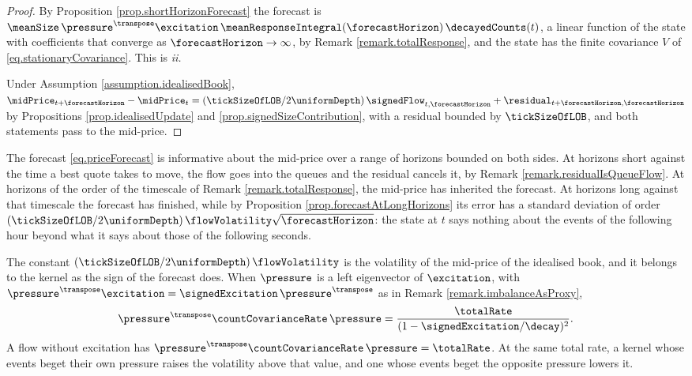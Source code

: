 \begin{proof}
 By Proposition \ref{prop.shortHorizonForecast} the forecast is
 $\meanSize \, \pressure^{\transpose} \excitation \,
 \meanResponseIntegral(\forecastHorizon) \, \decayedCounts(t)$,
 a linear function of the state with coefficients that converge as
 $\forecastHorizon \to \infty$, by Remark \ref{remark.totalResponse},
 and the state has the finite covariance $V$ of \eqref{eq.stationaryCovariance}.
 This is \emph{ii.}

 Under Assumption \ref{assumption.idealisedBook},
 $\midPrice_{t+\forecastHorizon} - \midPrice_{t}
 = (\tickSizeOfLOB / 2\uniformDepth) \, \signedFlow_{t,\forecastHorizon}
 + \residual_{t+\forecastHorizon,\forecastHorizon}$
 by Propositions \ref{prop.idealisedUpdate} and \ref{prop.signedSizeContribution},
 with a residual bounded by $\tickSizeOfLOB$,
 and both statements pass to the mid-price.
\end{proof}

\begin{remark}\label{remark.threeRangesOfHorizon}
 The forecast \eqref{eq.priceForecast} is informative about the mid-price over a range of
 horizons bounded on both sides.
 At horizons short against the time a best quote takes to move,
 the flow goes into the queues and the residual cancels it,
 by Remark \ref{remark.residualIsQueueFlow}.
 At horizons of the order of the timescale of Remark \ref{remark.totalResponse},
 the mid-price has inherited the forecast.
 At horizons long against that timescale the forecast has finished,
 while by Proposition \ref{prop.forecastAtLongHorizons} its error has a standard deviation
 of order
 $(\tickSizeOfLOB / 2\uniformDepth) \, \flowVolatility \sqrt{\forecastHorizon}$:
 the state at $t$ says nothing about the events of the following hour
 beyond what it says about those of the following seconds.

 The constant $(\tickSizeOfLOB / 2\uniformDepth) \, \flowVolatility$ is the volatility of the
 mid-price of the idealised book, and it belongs to the kernel as the sign of the forecast
 does.
 When $\pressure$ is a left eigenvector of $\excitation$,
 with $\pressure^{\transpose}\excitation = \signedExcitation \, \pressure^{\transpose}$
 as in Remark \ref{remark.imbalanceAsProxy},
 \begin{equation}\label{eq.flowVolatilityAtConstantSignedExcitation}
  \pressure^{\transpose} \countCovarianceRate \, \pressure
  = \frac{\totalRate}{(1 - \signedExcitation/\decay)^{2}} .
 \end{equation}
 A flow without excitation has $\pressure^{\transpose}\countCovarianceRate\,\pressure
 = \totalRate$.
 At the same total rate,
 a kernel whose events beget their own pressure raises the volatility above that value,
 and one whose events beget the opposite pressure lowers it.
\end{remark}
